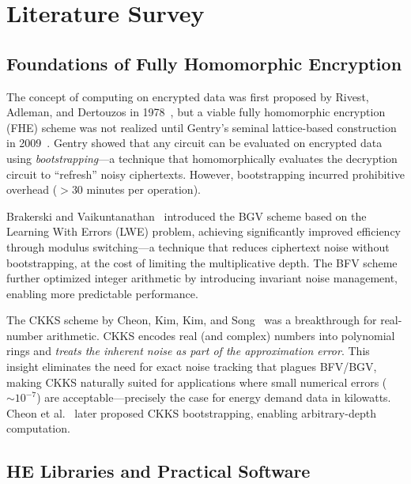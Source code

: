 \documentclass[conference,12pt]{IEEEtran}
\begin{document}
\section{Literature Survey}
\label{sec:literature}

\subsection{Foundations of Fully Homomorphic Encryption}

The concept of computing on encrypted data was first proposed by Rivest, Adleman, and Dertouzos in 1978~\cite{Rivest1978}, but a viable fully homomorphic encryption (FHE) scheme was not realized until Gentry's seminal lattice-based construction in 2009~\cite{Gentry2009}. Gentry showed that any circuit can be evaluated on encrypted data using \emph{bootstrapping}---a technique that homomorphically evaluates the decryption circuit to ``refresh'' noisy ciphertexts. However, bootstrapping incurred prohibitive overhead ($>$30 minutes per operation).

Brakerski and Vaikuntanathan~\cite{Brakerski2011} introduced the BGV scheme based on the Learning With Errors (LWE) problem, achieving significantly improved efficiency through modulus switching---a technique that reduces ciphertext noise without bootstrapping, at the cost of limiting the multiplicative depth. The BFV scheme~\cite{Fan2012} further optimized integer arithmetic by introducing invariant noise management, enabling more predictable performance.

The CKKS scheme by Cheon, Kim, Kim, and Song~\cite{Cheon2017} was a breakthrough for real-number arithmetic. CKKS encodes real (and complex) numbers into polynomial rings and \emph{treats the inherent noise as part of the approximation error}. This insight eliminates the need for exact noise tracking that plagues BFV/BGV, making CKKS naturally suited for applications where small numerical errors ($\sim 10^{-7}$) are acceptable---precisely the case for energy demand data in kilowatts. Cheon et al.~\cite{Cheon2018bootstrapping} later proposed CKKS bootstrapping, enabling arbitrary-depth computation.

\subsection{HE Libraries and Practical Software}
\end{document}
